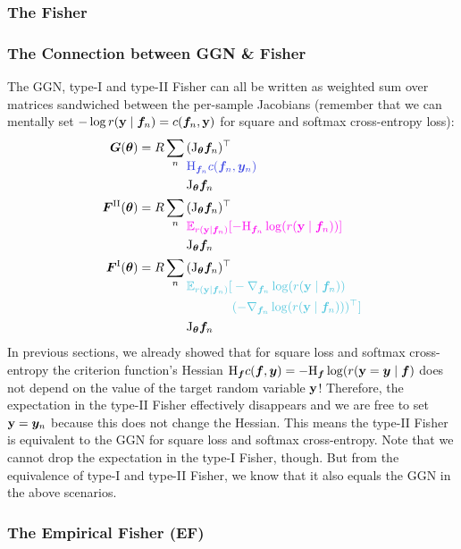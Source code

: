 \subsubsection{The Fisher}


\subsubsection{The Connection between GGN \& Fisher}
The GGN, type-I and type-II Fisher can all be written as weighted sum over matrices sandwiched between the per-sample Jacobians (remember that we can mentally set $-\log r({\mathbf{y}} \mid {\bm{f}}_n) = c({\bm{f}}_n, {\mathbf{y}})$ for square and softmax cross-entropy loss):
\begin{align*}
  \mG(\vtheta)
   & =
  R \sum_n
  \begin{aligned}[t]
     & (\jac_{\vtheta}\vf_n)^\top                           \\
     & \textcolor{VectorBlue}{\hess_{\vf_n}c(\vf_n, \vy_n)} \\
     & \jac_{\vtheta}\vf_n
  \end{aligned}
  \\
  \mF^{\text{II}}(\vtheta)
   & =
  R \sum_n
  \begin{aligned}[t]
     & (\jac_{\vtheta}\vf_n)^\top                                                                 \\
     & \textcolor{VectorPink}{\E_{r(\rvy \mid \vf_n)}[-\hess_{\vf_n} \log( r(\rvy \mid \vf_n)) ]} \\
     & \jac_{\vtheta}\vf_n
  \end{aligned}
  \\
  \mF^{\text{I}}(\vtheta)
   & =
  R \sum_n
  \begin{aligned}[t]
     & (\jac_{\vtheta}\vf_n)^\top                          \\
     & \textcolor{VectorTeal}{\E_{r(\rvy \mid \vf_n)}[
    \begin{aligned}[t]
       & -\nabla_{\vf_n} \log( r(\rvy \mid \vf_n))           \\
       & (-\nabla_{\vf_n} \log( r(\rvy \mid \vf_n)))^{\top}]
    \end{aligned}} \\
     & \jac_{\vtheta}\vf_n
  \end{aligned}
\end{align*}
In previous sections, we already showed that for square loss and softmax cross-entropy the criterion function's Hessian $\mathrm{H}_{\bm{f}} c({\bm{f}}, {\bm{y}}) = -\mathrm{H}_{{\bm{f}}} \log( r({\mathbf{y}} = {\bm{y}} \mid {\bm{f}})$ does not depend on the value of the target random variable ${\mathbf{y}}$!
Therefore, the expectation in the type-II Fisher effectively disappears and we are free to set ${\mathbf{y}} = {\bm{y}}_n$ because this does not change the Hessian.
This means the type-II Fisher is equivalent to the GGN for square loss and softmax cross-entropy.
Note that we cannot drop the expectation in the type-I Fisher, though.
But from the equivalence of type-I and type-II Fisher, we know that it also equals the GGN in the above scenarios.

\subsubsection{The Empirical Fisher (EF)}

